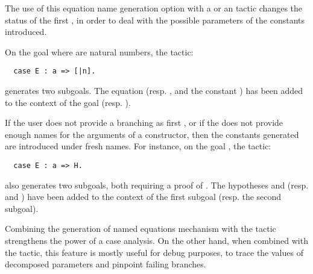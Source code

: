 The use of this equation name generation option with a  or an
 tactic changes the status of the first \iitem{}, in order to
deal with the possible parameters of the constants introduced.

On the
goal  where  are natural numbers, the tactic:
\begin{lstlisting}
  case E : a => [|n].
\end{lstlisting}
generates two subgoals. The equation   (resp. , and the constant ) has been added to
the context of the goal  (resp. ).

If the user does not provide a branching \iitem{} as first \iitem{},
or if the \iitem{} does not provide enough names for the arguments of
a constructor,
then the constants generated are introduced under fresh \ssr{} names.
For instance, on the goal , the tactic:
\begin{lstlisting}
  case E : a => H.
\end{lstlisting}
also generates two subgoals, both requiring a proof of .
 The hypotheses  and
 (resp.  and
) have been added to the context of the first
subgoal (resp. the second subgoal).

Combining the generation of named equations mechanism with the
 tactic strengthens the power of a case analysis. On the other
hand, when combined with the  tactic, this feature is mostly
useful for
debug purposes, to trace the values of decomposed parameters and
pinpoint failing branches.






